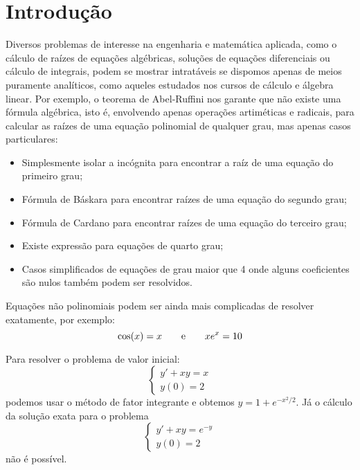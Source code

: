 \chapter{Introdução}

Diversos problemas de interesse na engenharia e matemática aplicada, como  o cálculo de raízes de equações algébricas, soluções de equações diferenciais ou cálculo de integrais, podem se mostrar intratáveis se dispomos apenas de meios puramente analíticos, como aqueles estudados nos cursos de cálculo e álgebra linear. Por exemplo, o teorema de Abel-Ruffini nos garante que não existe uma fórmula algébrica, isto é, envolvendo apenas operações artiméticas e radicais, para calcular as raízes de uma equação polinomial de qualquer grau, mas apenas casos particulares:
\begin{itemize}
\item Simplesmente isolar a incógnita para encontrar a raíz de uma equação do primeiro grau;
\item Fórmula de Báskara para encontrar raízes de uma equação do segundo grau;
\item Fórmula de Cardano para encontrar raízes de uma equação do terceiro grau;
\item Existe expressão para equações de quarto grau;
\item Casos simplificados de equações de grau maior que 4 onde alguns coeficientes são nulos também podem ser resolvidos.
\end{itemize}

Equações não polinomiais podem ser ainda mais complicadas de resolver exatamente, por exemplo:
\begin{equation}
\cos(x)=x\qquad \hbox{e}\qquad xe^x= 10
\end{equation}

Para resolver o problema de valor inicial:
\begin{equation}
\left\{
\begin{array}{l}
y'+xy=x\\
y(0)=2
\end{array}\right.
\end{equation}
podemos usar o método de fator integrante e obtemos $y=1+e^{-x^2/2}$. Já o cálculo da solução exata para o problema 
\begin{equation}
\left\{
\begin{array}{l}
y'+xy=e^{-y}\\
y(0)=2
\end{array}\right.
\end{equation}
não é possível.

